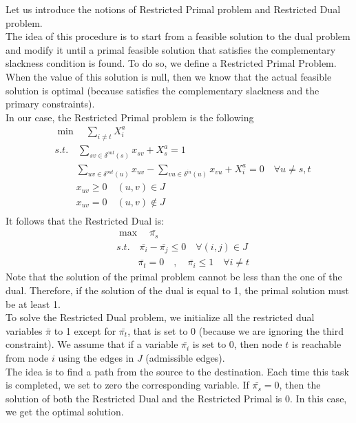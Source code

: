 \documentclass[a4paper,11pt]{article}
\begin{document}
Let us introduce the notions of Restricted Primal problem and Restricted Dual problem.\\ 
The idea of this procedure is to start from a feasible solution to the dual problem and modify it until a primal feasible solution that satisfies the complementary slackness condition is found. To do so, we define a Restricted Primal Problem. When the value of this solution is null, then we know that the actual feasible solution is optimal (because  satisfies the complementary slackness and the primary constraints).\\ 
In our case, the Restricted Primal problem is the following
\begin{align*}
	&\min \quad \sum_{i\ne t} X^{a}_{i}\\
	&s.t. \quad \sum_{sv\in \delta^{out}(s)} x_{sv} + X^{a}_{s} = 1\\
	&\qquad \ \sum_{uv\in \delta^{out}(u)} x_{uv}  - \sum_{vu\in \delta^{in}(u)} x_{vu} + X^{a}_{i} = 0    \quad \forall u \ne s,t \\
	&\qquad \ x_{uv} \ge 0 \quad (u,v) \in J\\
	&\qquad \ x_{uv} = 0  \quad (u,v) \notin J\\
\end{align*}
It follows that the Restricted Dual is:
\begin{align*}
	&\max \quad \bar{\pi_s}\\
	&s.t. \quad \bar{\pi_i} - \bar{\pi_j} \le 0 \quad \forall (i,j) \in J\\
	&\qquad \ \bar{\pi_t} = 0 \quad , \quad \bar{\pi_i} \le 1 \quad \forall i \ne t
\end{align*}
Note that the solution of the primal problem cannot be less than the one of the dual. Therefore, if the solution of the dual is equal to 1, the primal solution must be at least 1.\\ 
To solve the Restricted Dual problem, we initialize all the restricted dual variables $\bar{\pi}$ to 1 except for $\bar{\pi_t}$, that is set to 0 (because we are ignoring the third constraint). We assume that if a variable $\bar{\pi_i}$ is set to 0, then node $t$ is reachable from node $i$ using the edges in $J$ (admissible edges). \\
The idea is to find a path from the source to the destination. Each time this task is completed, we set to zero the corresponding variable. If  $\bar{\pi_s}=0$, then the solution of both the Restricted Dual and the Restricted Primal is 0. In this case, we get the optimal solution.\\
\end{document}
